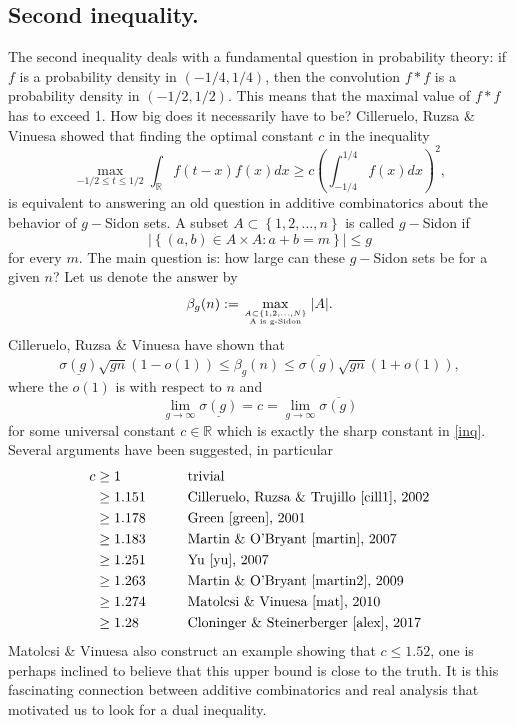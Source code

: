 \documentclass{amsart}
\theoremstyle{remark}
\begin{document}
\subsection{Second inequality.}
The second inequality deals with a fundamental question in probability theory: if $f$ is a probability density in $(-1/4, 1/4)$, then the convolution $f*f$ is a probability density in $(-1/2, 1/2)$.
This means that the maximal value of $f*f$ has to exceed 1. How big does it necessarily have to be?  Cilleruelo, Ruzsa \& Vinuesa \cite{cill2} showed that finding the optimal constant $c$
in the inequality
\begin{equation} \label{inq} \max_{-1/2 \leq t \leq 1/2} \int_{\mathbb{R}}{f(t-x) f(x) dx} \geq c \left( \int_{-1/4}^{1/4}{f(x) dx}\right)^2, \end{equation}
is equivalent to answering an old question in additive combinatorics about the behavior of $g-$Sidon sets.
A subset $A \subset \left\{1, 2, \dots, n\right\}$ is called $g-$Sidon if 
$$ | \left\{(a,b) \in A\times A: a+b=m\right\}| \leq g$$
for every $m$. The main question is: how large can these $g-$Sidon sets be for a given $n$? Let us denote the answer by
$$ \beta_g(n) := \max_{A \subset \left\{1, 2, \dots, N\right\} \atop \mbox{\tiny A is g-Sidon}}{|A|}.$$
Cilleruelo, Ruzsa \& Vinuesa \cite{cill2} have shown that
$$\underline{\sigma(g)}\sqrt{gn}(1-o(1)) \leq \beta_g(n) \leq \overline{\sigma(g)}\sqrt{gn}(1+o(1)),$$
where the $o(1)$ is with respect to $n$ and 
$$ \lim_{g \rightarrow \infty}{\underline{\sigma(g)}} = c = \lim_{g \rightarrow \infty}{\overline{\sigma(g)}}$$
for some universal constant $c \in \mathbb{R}$ which is exactly the sharp constant in \eqref{inq}. Several
arguments have been suggested, in particular
\begin{align*}
c &\geq 1\qquad &&\mbox{trivial}\\
&\geq 1.151 \qquad &&\mbox{Cilleruelo, Ruzsa \& Trujillo \cite{cill1}, 2002} \\
&\geq  1.178 &&\mbox{Green \cite{green}, 2001}\\
&\geq  1.183 &&\mbox{Martin \& O'Bryant \cite{martin}, 2007}\\
&\geq  1.251 &&\mbox{Yu \cite{yu}, 2007}\\
&\geq  1.263 &&\mbox{Martin \& O'Bryant \cite{martin2}, 2009}\\
&\geq  1.274 &&\mbox{Matolcsi \& Vinuesa \cite{mat}, 2010}\\
&\geq  1.28 &&\mbox{Cloninger \& Steinerberger \cite{alex}, 2017}
\end{align*}
Matolcsi \& Vinuesa \cite{mat} also construct an example showing that $c \leq 1.52$, one is perhaps inclined to believe that this upper bound is close to the truth. It is this fascinating connection between additive combinatorics and real analysis that motivated us to look for a dual inequality.
\end{document}
